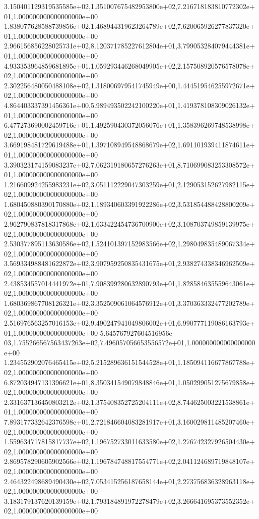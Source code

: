 3.150401129319535585e+02,1.351007675482953800e+02,7.216718183810772302e+01,1.000000000000000000e+00
1.838077628588739856e+02,1.468944319623264789e+02,7.620065926277837320e+01,1.000000000000000000e+00
2.966156856228025731e+02,8.120371785227612804e+01,3.799053284079444381e+01,1.000000000000000000e+00
4.933353964859681895e+01,1.059293446268049905e+02,2.157508920576578078e+02,1.000000000000000000e+00
2.302256480050488108e+02,1.318006979541745949e+00,1.444519546255972671e+02,1.000000000000000000e+00
4.864403337391456361e+00,5.989493502242100220e+01,1.419378108309026132e+01,1.000000000000000000e+00
6.477273690002459716e+01,1.492590430372056076e+01,1.358396269748538998e+02,1.000000000000000000e+00
3.669198481729619488e+01,1.397108949548868679e+02,1.691101939411874611e+01,1.000000000000000000e+00
3.390323174159083237e+02,7.062319180657276263e+01,8.710699083253308572e+01,1.000000000000000000e+00
1.216609924255983231e+02,3.051112229047303259e+01,2.129053152627982115e+02,1.000000000000000000e+00
1.680450880390170880e+02,1.189340603391922286e+02,3.531854488428800209e+02,1.000000000000000000e+00
2.962790837818317868e+02,1.633422454736700900e+02,3.108703749859139975e+02,1.000000000000000000e+00
2.530377895113630586e+02,1.524101397152983566e+02,1.298049835489067334e+02,1.000000000000000000e+00
3.569334988481622872e+02,3.907959250835431675e+01,2.938274338346962509e+02,1.000000000000000000e+00
2.438534557014441972e+01,7.908399280632890793e+01,1.828584635559643061e+02,1.000000000000000000e+00
1.680369867708126321e+02,3.352509061064576912e+01,3.370363332477202789e+02,1.000000000000000000e+00
2.516976563257016153e+02,9.490247941049806002e+01,6.990777119086163793e+01,1.000000000000000000e+00
5.645767927604516956e-03,1.755266567563437263e+02,7.496057056653556572e+01,1.000000000000000000e+00
1.234552902076465415e+02,5.215289636151544528e+01,1.185094116677867788e+02,1.000000000000000000e+00
6.872034947131396621e+01,8.350341549079848846e+01,1.050299051275679858e+02,1.000000000000000000e+00
2.331637136450803212e+02,1.375408352725204111e+02,8.744625003221538861e+01,1.000000000000000000e+00
7.893177332642376598e+01,2.721846604083281917e+01,3.160029811485207460e+02,1.000000000000000000e+00
1.559634717815817737e+02,1.196752733011633580e+02,1.276742327926504430e+02,1.000000000000000000e+00
2.869578290605902566e+02,1.196784748817554771e+02,2.041124689719848107e+02,1.000000000000000000e+00
2.464322498689490430e+02,7.053415256187658144e+01,2.273756836328963118e+02,1.000000000000000000e+00
3.183179137620139159e+02,1.793184891972278479e+02,3.266641695373552352e+02,1.000000000000000000e+00
